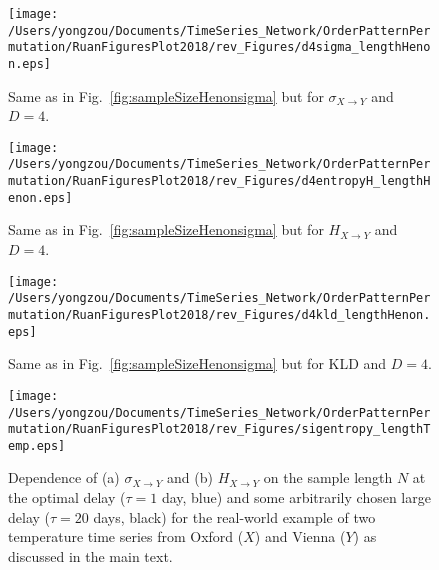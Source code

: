 \documentclass[aps,pre,superscriptaddress,floats,11pt]{revtex4}
\begin{document}
\begin{figure}[htb]
	\centering
	\texttt{[image: /Users/yongzou/Documents/TimeSeries\_Network/OrderPatternPermutation/RuanFiguresPlot2018/rev\_Figures/d4sigma\_lengthHenon.eps]}
\caption{Same as in Fig.~\ref{fig:sampleSizeHenonsigma} but for $\sigma_{X \to Y}$ and $D = 4$. \label{fig:d4sampleSizeHenonsigma}}
\end{figure}

\begin{figure}[htb]
	\centering
	\texttt{[image: /Users/yongzou/Documents/TimeSeries\_Network/OrderPatternPermutation/RuanFiguresPlot2018/rev\_Figures/d4entropyH\_lengthHenon.eps]}
\caption{Same as in Fig.~\ref{fig:sampleSizeHenonsigma} but for $H_{X \to Y}$ and $D = 4$. \label{fig:d4sampleSizeHenonentropy}}
\end{figure}

\begin{figure}[htb]
	\centering
	\texttt{[image: /Users/yongzou/Documents/TimeSeries\_Network/OrderPatternPermutation/RuanFiguresPlot2018/rev\_Figures/d4kld\_lengthHenon.eps]}
\caption{Same as in Fig.~\ref{fig:sampleSizeHenonsigma} but for KLD and $D = 4$. \label{fig:d4sampleSizeHenonkld}}
\end{figure}



\begin{figure}[htb]
	\centering
	\texttt{[image: /Users/yongzou/Documents/TimeSeries\_Network/OrderPatternPermutation/RuanFiguresPlot2018/rev\_Figures/sigentropy\_lengthTemp.eps]}
\caption{Dependence of (a) $\sigma_{X\to Y}$ and (b) $H_{X\to Y}$ on the sample length $N$ at the optimal delay ($\tau=1$ day, blue) and some arbitrarily chosen large delay ($\tau=20$ days, black) for the real-world example of two temperature time series from Oxford ($X$) and Vienna ($Y$) as discussed in the main text. \label{fig:sampleSizeTempentropy}}
\end{figure}


\end{document}
